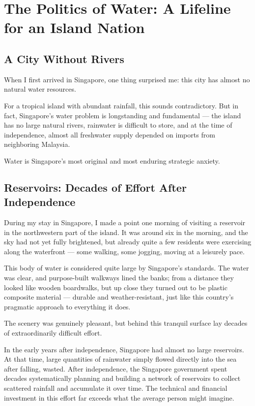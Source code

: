 \chapter{The Politics of Water: A Lifeline for an Island Nation}

\section{A City Without Rivers}

When I first arrived in Singapore, one thing surprised me: this city has almost no natural water resources.

For a tropical island with abundant rainfall, this sounds contradictory. But in fact, Singapore's water problem is longstanding and fundamental --- the island has no large natural rivers, rainwater is difficult to store, and at the time of independence, almost all freshwater supply depended on imports from neighboring Malaysia.

Water is Singapore's most original and most enduring strategic anxiety.

\section{Reservoirs: Decades of Effort After Independence}

During my stay in Singapore, I made a point one morning of visiting a reservoir in the northwestern part of the island. It was around six in the morning, and the sky had not yet fully brightened, but already quite a few residents were exercising along the waterfront --- some walking, some jogging, moving at a leisurely pace.

This body of water is considered quite large by Singapore's standards. The water was clear, and purpose-built walkways lined the banks; from a distance they looked like wooden boardwalks, but up close they turned out to be plastic composite material --- durable and weather-resistant, just like this country's pragmatic approach to everything it does.

The scenery was genuinely pleasant, but behind this tranquil surface lay decades of extraordinarily difficult effort.

In the early years after independence, Singapore had almost no large reservoirs. At that time, large quantities of rainwater simply flowed directly into the sea after falling, wasted. After independence, the Singapore government spent decades systematically planning and building a network of reservoirs to collect scattered rainfall and accumulate it over time. The technical and financial investment in this effort far exceeds what the average person might imagine.

